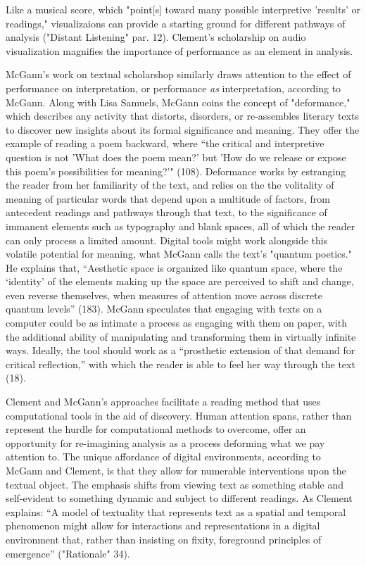 \documentclass[11pt]{article}
\begin{document}
Like a musical score, which "point[s] toward many possible
interpretive 'results' or readings," visualizaions can provide a
starting ground for different pathways of analysis ("Distant
Listening" par. 12). Clement's scholarship on audio visualization
magnifies the importance of performance as an element in analysis. 

McGann's work on textual scholarshop similarly draws attention to the
effect of performance on interpretation, or performance \emph{as}
interpretation, according to McGann. Along with Lisa Samuels, McGann
coins the concept of "deformance," which describes any activity that
distorts, disorders, or re-assembles literary texts to discover new
insights about its formal significance and meaning. They offer the
example of reading a poem backward, where “the critical and
interpretive question is not 'What does the poem mean?' but 'How do we
release or expose this poem’s possibilities for meaning?'"
(108). Deformance works by estranging the reader from her familiarity
of the text, and relies on the the volitality of meaning of particular
words that depend upon a multitude of factors, from antecedent
readings and pathways through that text, to the significance of
immanent elements such as typography and blank spaces, all of which
the reader can only process a limited amount. Digital tools might work
alongside this volatile potential for meaning, what McGann calls the
text's "quantum poetics." He explains that, “Aesthetic space is
organized like quantum space, where the ‘identity’ of the elements
making up the space are perceived to shift and change, even reverse
themselves, when measures of attention move across discrete quantum
levels” (183). McGann speculates that engaging with texts on a
computer could be as intimate a process as engaging with them on
paper, with the additional ability of manipulating and transforming
them in virtually infinite ways. Ideally, the tool should work as a
“prosthetic extension of that demand for critical reflection,” with
which the reader is able to feel her way through the text (18).

Clement and McGann's approaches facilitate a reading method that uses
computational tools in the aid of discovery. Human attention spans,
rather than represent the hurdle for computational methods to
overcome, offer an opportunity for re-imagining analysis as a process
deforming what we pay attention to. The unique affordance of digital
environments, according to McGann and Clement, is that they allow for
numerable interventions upon the textual object. The emphasis shifts
from viewing text as something stable and self-evident to something
dynamic and subject to different readings. As Clement explains: “A
model of textuality that represents text as a spatial and temporal
phenomenon might allow for interactions and representations in a
digital environment that, rather than insisting on fixity, foreground
principles of emergence” ("Rationale" 34).
\end{document}
